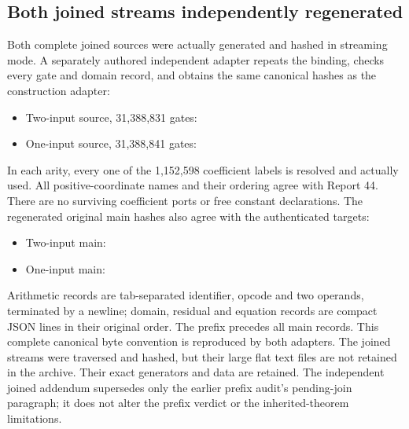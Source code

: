 \subsection{Both joined streams independently regenerated}
Both complete joined sources were actually generated and hashed in streaming mode. A separately authored independent adapter repeats the binding, checks every gate and domain record, and obtains the same canonical hashes as the construction adapter:
\begin{itemize}
\item Two-input source, 31,388,831 gates:\par\smallskip
{\small{}}
\item One-input source, 31,388,841 gates:\par\smallskip
{\small{}}
\end{itemize}
In each arity, every one of the 1,152,598 coefficient labels is resolved and actually used. All positive-coordinate names and their ordering agree with Report 44. There are no surviving coefficient ports or free constant declarations. The regenerated original main hashes also agree with the authenticated targets:
\begin{itemize}
\item Two-input main:\par\smallskip
{\small{}}
\item One-input main:\par\smallskip
{\small{}}
\end{itemize}
Arithmetic records are tab-separated identifier, opcode and two operands, terminated by a newline; domain, residual and equation records are compact JSON lines in their original order. The prefix precedes all main records. This complete canonical byte convention is reproduced by both adapters. The joined streams were traversed and hashed, but their large flat text files are not retained in the archive. Their exact generators and data are retained. The independent joined addendum supersedes only the earlier prefix audit's pending-join paragraph; it does not alter the prefix verdict or the inherited-theorem limitations.
